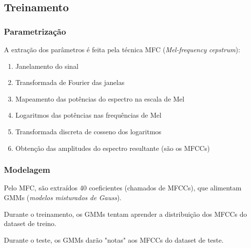 \documentclass{beamer}
\begin{document}
\subsection{Treinamento}

\begin{frame} %
    \frametitle{Parametrização}

    A extração dos parâmetros é feita pela técnica MFC (\emph{Mel-frequency cepstrum}):

    \begin{enumerate}
        \item Janelamento do sinal
        \item Transformada de Fourier das janelas
        \item Mapeamento das potências do espectro na escala de Mel
        \item Logaritmos das potências nas frequências de Mel
        \item Transformada discreta de cosseno dos logaritmos
        \item Obtenção das amplitudes do espectro resultante (são os MFCCs)
    \end{enumerate}

\end{frame}

\begin{frame} %
    \frametitle{Modelagem}

    Pelo MFC, são extraídos 40 coeficientes (chamados de MFCCs), que alimentam GMMs (\emph{modelos misturados de Gauss}).

    \medskip

    Durante o treinamento, os GMMs tentam aprender a distribuição dos MFCCs do dataset de treino.

    \medskip


    Durante o teste, os GMMs darão "notas" aos MFCCs do dataset de teste. 

\end{frame}
\end{document}
